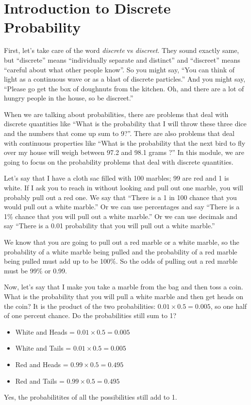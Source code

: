 \chapter{Introduction to Discrete Probability}

First, let's take care of the word \emph{discrete} vs \emph{discreet}.
They sound exactly same, but ``discrete'' means ``individually
separate and distinct'' and ``discreet'' means ``careful about what
other people know''.  So you might say, ``You can think of light as a
continuous wave or as a blast of discrete particles.'' And you might say,
``Please go get the box of doughnuts from the kitchen. Oh, and there
are a lot of hungry people in the house, so be discreet.''

When we are talking about probabilities, there are problems that deal
with discrete quantities like ``What is the probability that I will
throw these three dice and the numbers that come up sum to 9?''. There
are also problems that deal with continuous properties like ``What is
the probability that the next bird to fly over my house will weigh
between 97.2 and 98.1 grams ?'' In this module, we are going to focus
on the probability problems that deal with discrete quantities.

Let's say that I have a cloth sac filled with 100 marbles; 99 are red
and 1 is white. If I ask you to reach in without looking and pull out
one marble, you will probably pull out a red one. We say that ``There
is a 1 in 100 chance that you would pull out a white marble.'' Or we
can use percentages and say ``There is a 1\% chance that you will pull
out a white marble.'' Or we can use decimals and say ``There is a 0.01
probability that you will pull out a white marble.''

We know that you are going to pull out a red marble or a white marble,
so the probability of a white marble being pulled and the probability
of a red marble being pulled must add up to be 100\%.  So the odds of
pulling out a red marble must be 99\% or 0.99.

Now, let's say that I make you take a marble from the bag and then
toss a coin. What is the probability that you will pull a white marble
and then get heads on the coin? It is the product of the two
probabilities: $0.01 \times 0.5 = 0.005$, so one half of one percent
chance.  Do the probabilities still sum to 1?
\begin{itemize}
\item White and Heads = $0.01 \times 0.5 = 0.005$
\item White and Tails = $0.01 \times 0.5 = 0.005$
\item Red and Heads = $0.99 \times 0.5 = 0.495$
\item Red and Tails = $0.99 \times 0.5 = 0.495$
\end{itemize}
Yes, the probabilitites of all the possibilities still add to 1.

